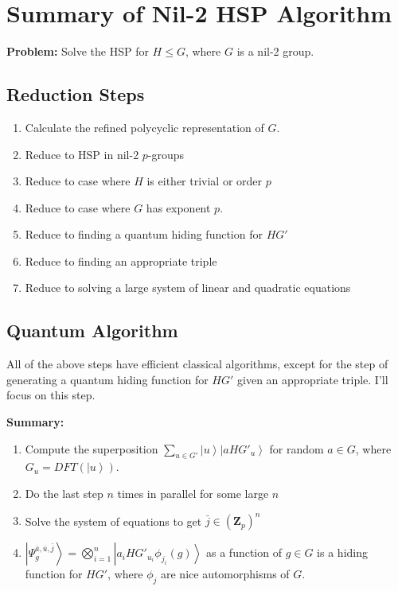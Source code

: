 \documentclass{article}
\newcommand{\ket}[1]{\left| #1 \right\rangle}
\begin{document}

\section{Summary of Nil-2 HSP Algorithm}

\textbf{Problem:} Solve the HSP for $H \leq G$, where $G$ is a nil-2 group.

\subsection{Reduction Steps}

\begin{enumerate}
\item Calculate the refined polycyclic representation of $G$.
\item Reduce to HSP in nil-2 $p$-groups
\item Reduce to case where $H$ is either trivial or order $p$
\item Reduce to case where $G$ has exponent $p$.
\item Reduce to finding a quantum hiding function for  $HG'$
\item Reduce to finding an appropriate triple
\item Reduce to solving a large system of linear and quadratic equations
\end{enumerate}

\subsection{Quantum Algorithm}

All of the above steps have efficient classical algorithms, except for the step of generating a quantum hiding function for $HG'$ given an appropriate triple.   I'll focus on this step.

\textbf{Summary:}
\begin{enumerate}
\item Compute the superposition $\sum_{u \in G'} \ket{u} \ket{aHG'_u}$ for random $a \in G$, where $G_u = DFT(\ket{u})$.
\item Do the last step $n$ times in parallel for some large $n$
\item Solve the system of equations to get $\bar j \in (\mathbf{Z}_p)^n$
\item $\ket{\Psi_g^{\bar a, \bar u, \bar j}} = \bigotimes_{i=1}^n \ket {a_i H G'_{u_i} \phi_{j_i}(g)}$ as a function of $g \in G$ is a hiding function for $H G'$, where $\phi_j$ are nice automorphisms of $G$.
\end{enumerate}
\end{document}
